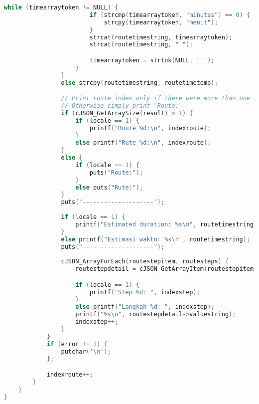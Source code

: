 \begin{lstlisting}[label={appdx:A-write-searchplacenoreturns}, language=C, caption=\texttt{write\textunderscore searchplace\textunderscore noreturns()}]
                    while (timearraytoken != NULL) {
                        if (strcmp(timearraytoken, "minutes") == 0) {
                            strcpy(timearraytoken, "menit");
                        }
                        strcat(routetimestring, timearraytoken);
                        strcat(routetimestring, " ");

                        timearraytoken = strtok(NULL, " ");
                    }
                }
                else strcpy(routetimestring, routetimetemp);

                // Print route index only if there were more than one found
                // Otherwise simply print "Route:"
                if (cJSON_GetArraySize(result) > 1) {
                    if (locale == 1) {
                        printf("Route %d:\n", indexroute);
                    }
                    else printf("Rute %d:\n", indexroute);
                }
                else {
                    if (locale == 1) {
                        puts("Route:");
                    }
                    else puts("Rute:");
                }
                puts("--------------------");
                
                if (locale == 1) {
                    printf("Estimated duration: %s\n", routetimestring);
                }
                else printf("Estimasi waktu: %s\n", routetimestring);
                puts("--------------------");
                
                cJSON_ArrayForEach(routestepitem, routesteps) {
                    routestepdetail = cJSON_GetArrayItem(routestepitem, 3);

                    if (locale == 1) {
                        printf("Step %d: ", indexstep);
                    }
                    else printf("Langkah %d: ", indexstep);
                    printf("%s\n", routestepdetail->valuestring);
                    indexstep++;
                }
            }
            if (error != 1) {
                putchar('\n');
            };

            indexroute++;
        }
    }
}
\end{lstlisting}


